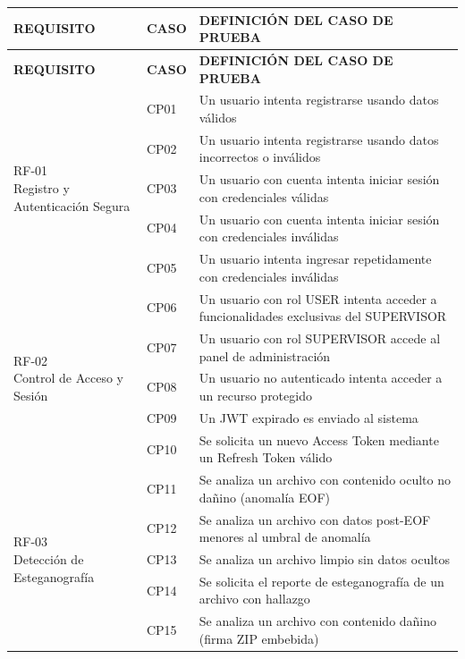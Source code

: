 \begin{longtable}{|p{2.2cm}|p{1.8cm}|p{10cm}|}
\hline
\textbf{REQUISITO} & \textbf{CASO} & \textbf{DEFINICIÓN DEL CASO DE PRUEBA} \\
\hline
\endfirsthead
\hline
\textbf{REQUISITO} & \textbf{CASO} & \textbf{DEFINICIÓN DEL CASO DE PRUEBA} \\
\hline
\endhead
\multirow{5}{*}{\parbox{2cm}{RF-01\\Registro y Autenticación Segura}}
 & CP01 & Un usuario intenta registrarse usando datos válidos \\
\cline{2-3}
 & CP02 & Un usuario intenta registrarse usando datos incorrectos o inválidos \\
\cline{2-3}
 & CP03 & Un usuario con cuenta intenta iniciar sesión con credenciales válidas \\
\cline{2-3}
 & CP04 & Un usuario con cuenta intenta iniciar sesión con credenciales inválidas \\
\cline{2-3}
 & CP05 & Un usuario intenta ingresar repetidamente con credenciales inválidas \\
\hline
\multirow{5}{*}{\parbox{2cm}{RF-02\\Control de Acceso y Sesión}}
 & CP06 & Un usuario con rol USER intenta acceder a funcionalidades exclusivas del SUPERVISOR \\
\cline{2-3}
 & CP07 & Un usuario con rol SUPERVISOR accede al panel de administración \\
\cline{2-3}
 & CP08 & Un usuario no autenticado intenta acceder a un recurso protegido \\
\cline{2-3}
 & CP09 & Un JWT expirado es enviado al sistema \\
\cline{2-3}
 & CP10 & Se solicita un nuevo Access Token mediante un Refresh Token válido \\
\hline
\multirow{7}{*}{\parbox{2cm}{RF-03\\Detección de Esteganografía}}
 & CP11 & Se analiza un archivo con contenido oculto no dañino (anomalía EOF) \\
\cline{2-3}
 & CP12 & Se analiza un archivo con datos post-EOF menores al umbral de anomalía \\
\cline{2-3}
 & CP13 & Se analiza un archivo limpio sin datos ocultos \\
\cline{2-3}
 & CP14 & Se solicita el reporte de esteganografía de un archivo con hallazgo \\
\cline{2-3}
 & CP15 & Se analiza un archivo con contenido dañino (firma ZIP embebida) \\

\end{longtable}
